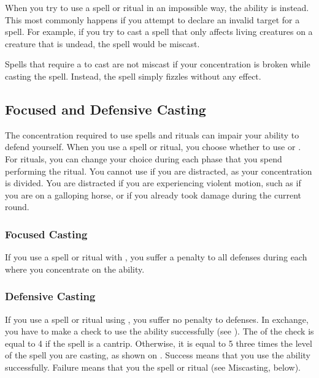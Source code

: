          When you try to use a spell or ritual in an impossible way, the ability is  instead.
        This most commonly happens if you attempt to declare an invalid target for a spell.
        For example, if you try to cast a spell that only affects living creatures on a creature that is undead, the spell would be miscast.

         Spells that require a  to cast are not miscast if your concentration is broken while casting the spell.
        Instead, the spell simply fizzles without any effect.

    \subsection{Focused and Defensive Casting}\label{Focused and Defensive Casting}
        The concentration required to use spells and rituals can impair your ability to defend yourself.
        When you use a spell or ritual, you choose whether to use  or .
        For rituals, you can change your choice during each phase that you spend performing the ritual.
        You cannot use  if you are distracted, as your concentration is divided.
        You are distracted if you are experiencing violent motion, such as if you are on a galloping horse, or if you already took damage during the current round.

        \subsubsection{Focused Casting}\label{Focused Casting}
            If you use a spell or ritual with , you suffer a  penalty to all defenses during each  where you concentrate on the ability.

        \subsubsection{Defensive Casting}\label{Defensive Casting}
            If you use a spell or ritual using , you suffer no penalty to defenses.
            In exchange, you have to make a  check to use the ability successfully (see ).
            The  of the check is equal to 4 if the spell is a cantrip.
            Otherwise, it is equal to 5 \add three times the level of the spell you are casting, as shown on .
            Success means that you use the ability successfully.
            Failure means that you  the spell or ritual (see Miscasting, below).

